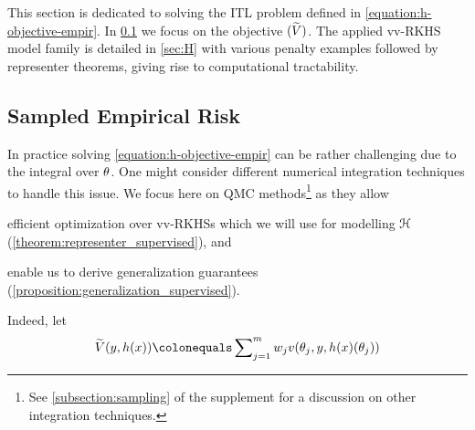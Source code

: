 \label{sec:III}
This section is dedicated to solving the \ac{ITL} problem  defined in
\cref{equation:h-objective-empir}. In \cref{sec:V} we focus on the objective
$(\widetilde{V})$. The applied \ac{vv-RKHS} model family is detailed in
\cref{sec:H} with various penalty examples followed by representer theorems,
giving rise to computational tractability.
%
\subsection{Sampled Empirical Risk} \label{sec:V}
In practice solving \cref{equation:h-objective-empir} can be rather challenging
due to the integral over $\theta$.  One might consider
different numerical integration techniques to handle this issue.
We focus here on \ac{QMC} methods\footnote{See \cref{subsection:sampling} of
the supplement for a discussion on other integration techniques.} as they allow
\begin{inparaenum}[(i)]
    \item efficient optimization over \acp{vv-RKHS} which we will use for
    modelling $\mathcal{H}$ (\cref{theorem:representer_supervised}), and
    \item enable us to derive generalization guarantees
    (\cref{proposition:generalization_supervised}).
\end{inparaenum}
Indeed, let
\begin{align}\label{equation:integrated_cost}
   \sampledcost(y, h(x)) \defeq \sum\nolimits_{j=1}^m w_j
   \hcost(\hyperparameter_j,y, h(x)(\hyperparameter_j))
\end{align}
